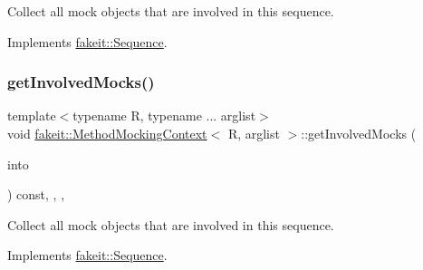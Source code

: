 Collect all mock objects that are involved in this sequence. 



Implements \mbox{\hyperlink{classfakeit_1_1Sequence_a4af96a0de0fa659fe826431e4d61757a}{fakeit\+::\+Sequence}}.

\mbox{\label{classfakeit_1_1MethodMockingContext_ac66ba7b51a3c845b8fe8f2fa0f5f5ff0}} 
\subsubsection{\texorpdfstring{getInvolvedMocks()}{getInvolvedMocks()}\hspace{0.1cm}{\footnotesize\ttfamily [4/9]}}
{\footnotesize\ttfamily template$<$typename R, typename ... arglist$>$ \\
void \mbox{\hyperlink{classfakeit_1_1MethodMockingContext}{fakeit\+::\+Method\+Mocking\+Context}}$<$ R, arglist $>$\+::get\+Involved\+Mocks (\begin{DoxyParamCaption}\item[{std\+::vector$<$ \mbox{\hyperlink{structfakeit_1_1ActualInvocationsSource}{Actual\+Invocations\+Source}} $\ast$ $>$ \&}]{into }\end{DoxyParamCaption}) const\hspace{0.3cm}{\ttfamily [inline]}, {\ttfamily [override]}, {\ttfamily [protected]}, {\ttfamily [virtual]}}



Collect all mock objects that are involved in this sequence. 



Implements \mbox{\hyperlink{classfakeit_1_1Sequence_a4af96a0de0fa659fe826431e4d61757a}{fakeit\+::\+Sequence}}.

\mbox{\label{classfakeit_1_1MethodMockingContext_ac66ba7b51a3c845b8fe8f2fa0f5f5ff0}} 
